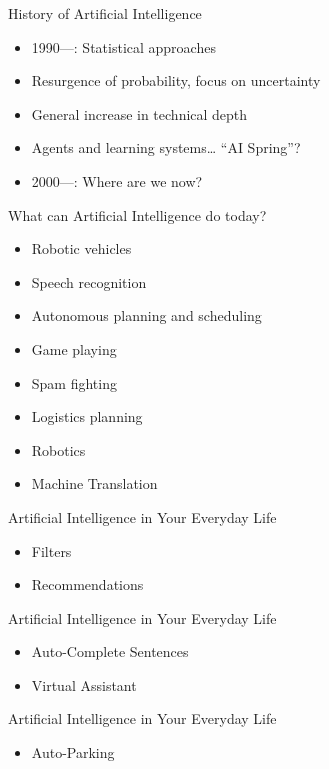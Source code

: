 \documentclass{beamer}
\begin{document}
\begin{frame}{History of Artificial Intelligence}
\begin{itemize}
\item 1990—: Statistical approaches
\item Resurgence of probability, focus on uncertainty
\item General increase in technical depth
\item Agents and learning systems… “AI Spring”?
\item 2000—: Where are we now?
\end{itemize}
\end{frame}

\begin{frame}{What can Artificial Intelligence do today?}
\begin{itemize}
\item Robotic vehicles
\item Speech recognition
\item Autonomous planning and scheduling
\item Game playing
\item Spam fighting
\item Logistics planning
\item Robotics
\item Machine Translation
\end{itemize}
\end{frame}

\begin{frame}{Artificial Intelligence in Your Everyday Life}
\begin{itemize}
\item Filters
\item Recommendations
\end{itemize}
\end{frame}

\begin{frame}{Artificial Intelligence in Your Everyday Life}
\begin{itemize}
\item Auto-Complete Sentences
\item Virtual Assistant
\end{itemize}
\end{frame}

\begin{frame}{Artificial Intelligence in Your Everyday Life}
\begin{itemize}
\item Auto-Parking
\end{itemize}
\end{frame}
\end{document}
